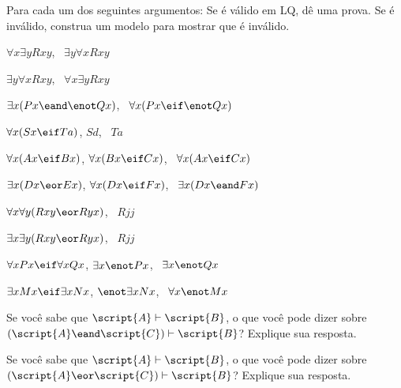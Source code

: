 \solutions
\problempart
\label{pr.QLvalidornot}
Para cada um dos seguintes argumentos: Se é válido em LQ, dê uma prova. Se é inválido, construa um modelo para mostrar que é inválido.
\begin{earg}
\item $\forall x\exists y Rxy$, \therefore\ $\exists y\forall x Rxy$
\item $\exists y\forall x Rxy$, \therefore\ $\forall x\exists y Rxy$
\item $\exists x(Px \eand \enot Qx)$, \therefore\ $\forall x(Px \eif \enot Qx)$
\item $\forall x(Sx \eif Ta)$, $Sd$, \therefore\ $Ta$
\item $\forall x(Ax\eif Bx)$, $\forall x(Bx \eif Cx)$, \therefore\ $\forall x(Ax \eif Cx)$
\item $\exists x(Dx \eor Ex)$, $\forall x(Dx \eif Fx)$, \therefore\ $\exists x(Dx \eand Fx)$
\item $\forall x\forall y(Rxy \eor Ryx)$, \therefore\ $Rjj$
\item $\exists x\exists y(Rxy \eor Ryx)$, \therefore\ $Rjj$
\item $\forall x Px \eif \forall x Qx$, $\exists x \enot Px$, \therefore\ $\exists x \enot Qx$
\item $\exists x Mx \eif \exists x Nx$, $\enot \exists x Nx$, \therefore\ $\forall x \enot Mx$
\end{earg}






\problempart
\begin{earg}
\item Se você sabe que $\script{A}\vdash\script{B}$, o que você pode dizer sobre $(\script{A}\eand\script{C})\vdash\script{B}$? Explique sua resposta.
\item Se você sabe que $\script{A}\vdash\script{B}$, o que você pode dizer sobre $(\script{A}\eor\script{C})\vdash\script{B}$? Explique sua resposta.
\end{earg}
